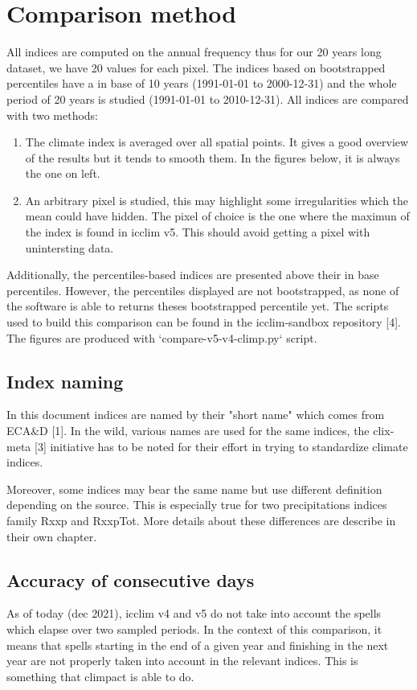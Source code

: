 \documentclass[a4paper,11pt]{article}
\begin{document}
\section{Comparison method}
    All indices are computed on the annual frequency thus for our 20 years long dataset, we have 20 values for each pixel.
    The indices based on bootstrapped percentiles have a in base of 10 years (1991-01-01 to 2000-12-31) and the whole period of 20 years is studied (1991-01-01 to 2010-12-31).
    All indices are compared with two methods: 
    \begin{enumerate}
        \item The climate index is averaged over all spatial points. 
        It gives a good overview of the results but it tends to smooth them. In the figures below, it is always the one on left.
        \item An arbitrary pixel is studied, this may highlight some irregularities which the mean could have hidden. The pixel of choice is the one where the maximun of the index is found in icclim v5. This should avoid getting a pixel with unintersting data.
    \end{enumerate}
    Additionally, the percentiles-based indices are presented above their in base percentiles. However, the percentiles displayed are not bootstrapped, as none of the software is able to returns theses bootstrapped percentile yet.
    The scripts used to build this comparison can be found in the icclim-sandbox repository [4].
    The figures are produced with `compare-v5-v4-climp.py` script.

\subsection{Index naming}
    In this document indices are named by their "short name" which comes from 
    ECA\&D [1].
    In the wild, various names are used for the same indices, the clix-meta [3] initiative has to be noted for their effort in trying to standardize climate indices.

    Moreover, some indices may bear the same name but use different definition depending on the source. This is especially true for two precipitations indices family Rxxp and RxxpTot.
    More details about these differences are describe in their own chapter.
\subsection{Accuracy of consecutive days}
    As of today (dec 2021), icclim v4 and v5 do not take into account the spells which elapse over two sampled periods. In the context of this comparison, it means that spells starting in the end of a given year and finishing in the next year are not properly taken into account in the relevant indices.
    This is something that climpact is able to do.
\end{document}

